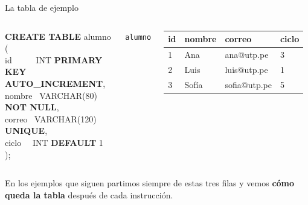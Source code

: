 \documentclass[aspectratio=169,10pt,c]{beamer}
\newcommand{\tbl}[1]{\textcolor{utpNaranja}{\texttt{#1}}}
\newcommand{\kw}[1]{\textcolor{utpRojo}{\textbf{#1}}}
\newenvironment{sqlcode}[1][.86\textwidth]
  {\begin{center}\begin{lrbox}{\sqlbuf}\begin{minipage}{#1}\ttfamily\footnotesize\vspace{6pt}\raggedright}
  {\vspace{6pt}\end{minipage}\end{lrbox}\colorbox{utpGrisClaro}{\usebox{\sqlbuf}}\end{center}}
\newcommand{\ind}{\hspace*{1.6em}}
\begin{document}
\begin{frame}{La tabla de ejemplo}
\begin{columns}[c,onlytextwidth]
\begin{sqlcode}[\textwidth]
\scriptsize
\kw{CREATE TABLE} alumno (\\
\ind id \ \ \ \ \ INT \kw{PRIMARY KEY} \kw{AUTO\_INCREMENT},\\
\ind nombre \ VARCHAR(80) \kw{NOT NULL},\\
\ind correo \ VARCHAR(120) \kw{UNIQUE},\\
\ind ciclo \ \ INT \kw{DEFAULT} 1\\
);
\end{sqlcode}
\centering\tbl{alumno}\\[4pt]
\scriptsize\ttfamily
\begin{tabular}{llll}
\toprule
\normalfont\bfseries id & \normalfont\bfseries nombre & \normalfont\bfseries correo & \normalfont\bfseries ciclo \\
\midrule
1 & Ana & ana@utp.pe & 3 \\
2 & Luis & luis@utp.pe & 1 \\
3 & Sofía & sofia@utp.pe & 5 \\
\bottomrule
\end{tabular}
\end{columns}
\vspace{0.5cm}
\small En los ejemplos que siguen partimos siempre de estas tres filas y vemos \textbf{cómo queda la tabla} después de cada instrucción.
\vspace{0.3cm}

\end{frame}
\end{document}
